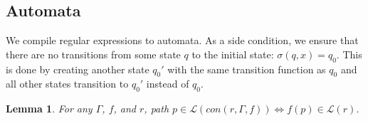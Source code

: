 \documentclass[twocolumn, openany]{sig-alternate-10pt}
\newtheorem{lem}[thm]{Lemma}
\begin{document}
\subsection{Automata}

\newcommand{\Lang}{\ensuremath{\mathcal{L}}}

We compile regular expressions to automata. As a side condition, we ensure that there are no transitions from some state $q$ to the initial state: $\sigma(q,x) = q_0$. This is done by creating another state $q_0'$ with the same transition function as $q_0$ and all other states transition to $q_0'$ instead of $q_0$.

\vspace{1em}
\begin{lem}
  For any $\Gamma$, $f$, and $r$, path $p \in \Lang(con(r,\Gamma,f)) \iff f(p) \in \Lang(r)$.
\end{lem}
\end{document}
